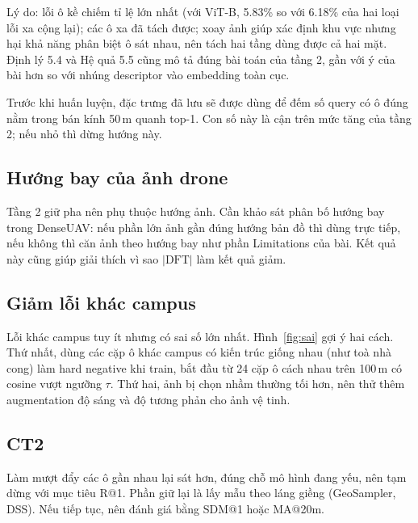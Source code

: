 \documentclass[11pt,a4paper]{article}
\begin{document}
Lý do: lỗi ô kề chiếm tỉ lệ lớn nhất (với ViT-B, 5.83\% so với 6.18\% của hai loại lỗi xa cộng lại); các ô xa đã tách được; xoay ảnh giúp xác định khu vực nhưng hại khả năng phân biệt ô sát nhau, nên tách hai tầng dùng được cả hai mặt. Định lý 5.4 và Hệ quả 5.5 cũng mô tả đúng bài toán của tầng 2, gần với ý của bài hơn so với nhúng descriptor vào embedding toàn cục.

Trước khi huấn luyện, đặc trưng đã lưu sẽ được dùng để đếm số query có ô đúng nằm trong bán kính 50\,m quanh top-1. Con số này là cận trên mức tăng của tầng 2; nếu nhỏ thì dừng hướng này.

\subsection{Hướng bay của ảnh drone}
Tầng 2 giữ pha nên phụ thuộc hướng ảnh. Cần khảo sát phân bố hướng bay trong DenseUAV: nếu phần lớn ảnh gần đúng hướng bản đồ thì dùng trực tiếp, nếu không thì căn ảnh theo hướng bay như phần Limitations của bài. Kết quả này cũng giúp giải thích vì sao $|\mathrm{DFT}|$ làm kết quả giảm.

\subsection{Giảm lỗi khác campus}
Lỗi khác campus tuy ít nhưng có sai số lớn nhất. Hình~\ref{fig:sai} gợi ý hai cách. Thứ nhất, dùng các cặp ô khác campus có kiến trúc giống nhau (như toà nhà cong) làm hard negative khi train, bắt đầu từ 24 cặp ô cách nhau trên 100\,m có cosine vượt ngưỡng $\tau$. Thứ hai, ảnh bị chọn nhầm thường tối hơn, nên thử thêm augmentation độ sáng và độ tương phản cho ảnh vệ tinh.

\subsection{CT2}
Làm mượt đẩy các ô gần nhau lại sát hơn, đúng chỗ mô hình đang yếu, nên tạm dừng với mục tiêu R@1. Phần giữ lại là lấy mẫu theo láng giềng (GeoSampler, DSS). Nếu tiếp tục, nên đánh giá bằng SDM@1 hoặc MA@20m.
\end{document}
